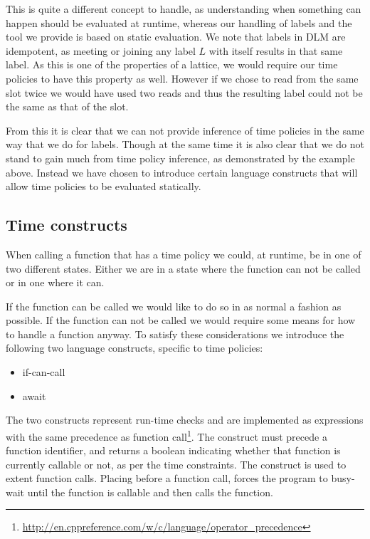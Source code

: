 This is quite a different concept to handle, as understanding when something can happen should be evaluated at runtime, whereas our handling of labels and the tool we provide is based on static evaluation.
We note that labels in DLM are idempotent, as meeting or joining any label $L$ with itself results in that same label.
As this is one of the properties of a lattice, we would require our time policies to have this property as well.
However if we chose to read from the same slot twice we would have used two reads and thus the resulting label could not be the same as that of the slot.

From this it is clear that we can not provide inference of time policies in the same way that we do for labels.
Though at the same time it is also clear that we do not stand to gain much from time policy inference, as demonstrated by the example above.
Instead we have chosen to introduce certain language constructs that will allow time policies to be evaluated statically.

\subsection{Time constructs}\label{time:constructs}
When calling a function that has a time policy we could, at runtime, be in one of two different states.
Either we are in a state where the function can not be called or in one where it can.

If the function can be called we would like to do so in as normal a fashion as possible.
If the function can not be called we would require some means for how to handle a function anyway.
To satisfy these considerations we introduce the following two language constructs, specific to time policies:

\begin{itemize}
  \item if-can-call 
  \item await 
\end{itemize}

The two constructs represent run-time checks and are implemented as expressions with the same precedence as function call\footnote{\url{http://en.cppreference.com/w/c/language/operator_precedence}}.
The  construct must precede a function identifier, and returns a boolean indicating whether that function is currently callable or not, as per the time constraints.
The  construct is used to extent function calls. Placing  before a function call, forces the program to busy-wait until the function is callable and then calls the function.

